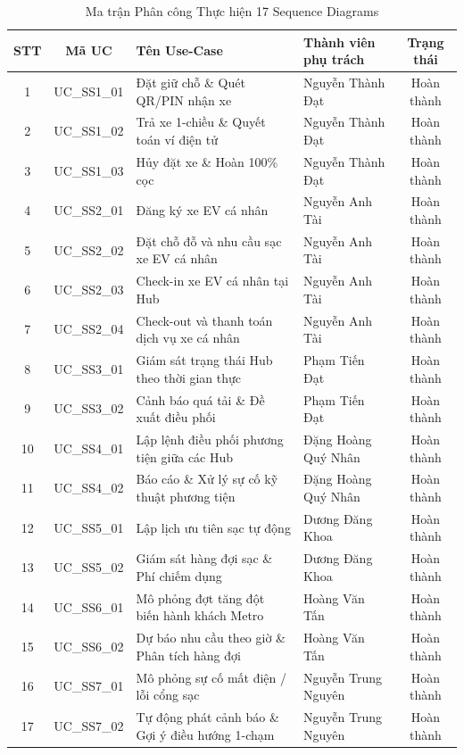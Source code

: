 \documentclass[12pt,a4paper]{article}
\begin{document}
\begin{table}[H]
    \centering
    \small
    \renewcommand{\arraystretch}{1.25}
    \caption{Ma trận Phân công Thực hiện 17 Sequence Diagrams}
    \label{tab:seq-assignment}
    \begin{tabularx}{\textwidth}{|c|c|X|l|c|}
        \hline
        \textbf{STT} & \textbf{Mã UC} & \textbf{Tên Use-Case} & \textbf{Thành viên phụ trách} & \textbf{Trạng thái} \\
        \hline
        1 & UC\_SS1\_01 & Đặt giữ chỗ \& Quét QR/PIN nhận xe & Nguyễn Thành Đạt & Hoàn thành \\
        2 & UC\_SS1\_02 & Trả xe 1-chiều \& Quyết toán ví điện tử & Nguyễn Thành Đạt & Hoàn thành \\
        3 & UC\_SS1\_03 & Hủy đặt xe \& Hoàn 100\% cọc & Nguyễn Thành Đạt & Hoàn thành \\
        \hline
        4 & UC\_SS2\_01 & Đăng ký xe EV cá nhân & Nguyễn Anh Tài & Hoàn thành \\
        5 & UC\_SS2\_02 & Đặt chỗ đỗ và nhu cầu sạc xe EV cá nhân & Nguyễn Anh Tài & Hoàn thành \\
        6 & UC\_SS2\_03 & Check-in xe EV cá nhân tại Hub & Nguyễn Anh Tài & Hoàn thành \\
        7 & UC\_SS2\_04 & Check-out và thanh toán dịch vụ xe cá nhân & Nguyễn Anh Tài & Hoàn thành \\
        \hline
        8 & UC\_SS3\_01 & Giám sát trạng thái Hub theo thời gian thực & Phạm Tiến Đạt & Hoàn thành \\
        9 & UC\_SS3\_02 & Cảnh báo quá tải \& Đề xuất điều phối & Phạm Tiến Đạt & Hoàn thành \\
        \hline
        10 & UC\_SS4\_01 & Lập lệnh điều phối phương tiện giữa các Hub & Đặng Hoàng Quý Nhân & Hoàn thành \\
        11 & UC\_SS4\_02 & Báo cáo \& Xử lý sự cố kỹ thuật phương tiện & Đặng Hoàng Quý Nhân & Hoàn thành \\
        \hline
        12 & UC\_SS5\_01 & Lập lịch ưu tiên sạc tự động & Dương Đăng Khoa & Hoàn thành \\
        13 & UC\_SS5\_02 & Giám sát hàng đợi sạc \& Phí chiếm dụng & Dương Đăng Khoa & Hoàn thành \\
        \hline
        14 & UC\_SS6\_01 & Mô phỏng đợt tăng đột biến hành khách Metro & Hoàng Văn Tấn & Hoàn thành \\
        15 & UC\_SS6\_02 & Dự báo nhu cầu theo giờ \& Phân tích hàng đợi & Hoàng Văn Tấn & Hoàn thành \\
        \hline
        16 & UC\_SS7\_01 & Mô phỏng sự cố mất điện / lỗi cổng sạc & Nguyễn Trung Nguyên & Hoàn thành \\
        17 & UC\_SS7\_02 & Tự động phát cảnh báo \& Gợi ý điều hướng 1-chạm & Nguyễn Trung Nguyên & Hoàn thành \\
        \hline
    \end{tabularx}
\end{table}
\end{document}
